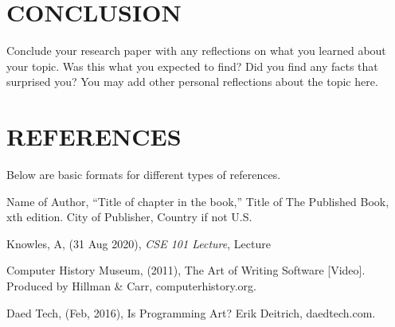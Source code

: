 \documentclass[letterpaper, 10 pt, conference]{IEEEconf}
\begin{document}
\section{CONCLUSION}

Conclude your research paper with any reflections on what you
learned about your topic. Was this what you expected to find?
Did you find any facts that surprised you? You may add other
personal reflections about the topic here.

\section*{REFERENCES}

Below are basic formats for different types of references.

\begin{enumerate}[label={[\arabic*]}]
\item Name of Author, ``Title of chapter in the book,''
Title of The Published Book, xth edition. City of
Publisher, Country if not U.S.
\item Knowles, A, (31 Aug 2020), \emph{CSE 101 Lecture}, Lecture
\item Computer History Museum, (2011),
The Art of Writing Software [Video].
Produced by Hillman & Carr, computerhistory.org.
\item Daed Tech, (Feb, 2016),
Is Programming Art? Erik Deitrich, daedtech.com.
\end{enumerate}
\end{document}
